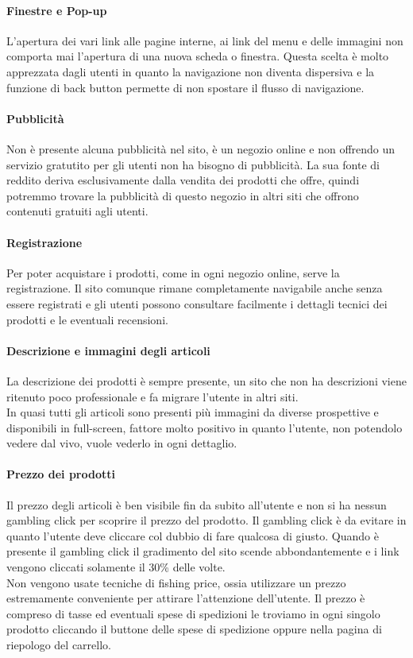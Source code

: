 \documentclass[12pt]{article}
\begin{document}
	\paragraph{Finestre e Pop-up} L'apertura dei vari link alle pagine interne, ai link del menu e delle immagini non comporta mai l'apertura di una nuova scheda o finestra. Questa scelta è molto apprezzata dagli utenti in quanto la navigazione non diventa dispersiva e la funzione di back button permette di non spostare il flusso di navigazione.
	\\
	\newpage
	\paragraph{Pubblicità} Non è presente alcuna pubblicità nel sito, è un negozio online e non offrendo un servizio gratutito per gli utenti non ha bisogno di pubblicità. La sua fonte di reddito deriva esclusivamente dalla vendita dei prodotti che offre, quindi potremmo trovare la pubblicità di questo negozio in altri siti che offrono contenuti gratuiti agli utenti. 
	\\
	\paragraph{Registrazione} Per poter acquistare i prodotti, come in ogni negozio online, serve la registrazione. Il sito comunque rimane completamente navigabile anche senza essere registrati e gli utenti possono consultare facilmente i dettagli tecnici dei prodotti e le eventuali recensioni.
	\\
	\paragraph{Descrizione e immagini degli articoli} La descrizione dei prodotti è sempre presente, un sito che non ha descrizioni viene ritenuto poco professionale e fa migrare l'utente in altri siti.\\
	In quasi tutti gli articoli sono presenti più immagini da diverse prospettive e disponibili in full-screen, fattore molto positivo in quanto l'utente, non potendolo vedere dal vivo, vuole vederlo in ogni dettaglio.
	\\    
	\paragraph{Prezzo dei prodotti} Il prezzo degli articoli è ben visibile fin da subito all'utente e non si ha nessun gambling click per scoprire il prezzo del prodotto. Il gambling click è da evitare in quanto l'utente deve cliccare col dubbio di fare qualcosa di giusto. Quando è presente il gambling click il gradimento del sito scende abbondantemente e i link vengono cliccati solamente il 30\% delle volte.
	\\ 	Non vengono usate tecniche di fishing price, ossia utilizzare un prezzo estremamente conveniente per attirare l'attenzione dell'utente. Il prezzo è compreso di tasse ed eventuali spese di spedizioni le troviamo in ogni singolo prodotto cliccando il buttone delle spese di spedizione oppure nella pagina di riepologo del carrello.
	\newpage
\end{document}
